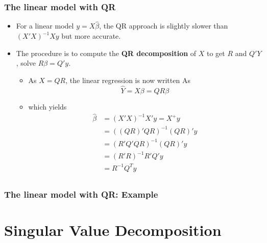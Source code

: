 \documentclass[10pt]{beamer}
\begin{document}
\begin{frame}
  \frametitle{The linear model with QR}

  \begin{itemize}
  \item For a linear model $y=X\hat\beta$, the QR approach is slightly
    slower than $(X'X)^{-1}Xy$ but more accurate.

  \item The procedure is to compute the \textbf{QR decomposition} of
    $X$ to get $R$ and $Q'Y$ , solve $R\beta = Q'y$.


    \begin{itemize}
    \item As $X=QR$, the linear regression is now written As
      \begin{equation*}
        \hat Y = X\beta = QR\beta
      \end{equation*}
    \item which yields
      \begin{align*}
        \hat \beta & = (X'X)^{-1}X'y= X^{+}y \\
        & = ((QR)'QR)^{-1}(QR)'y \\
        & = (R'Q'QR)^{-1}(QR)'y\\
        & = (R'R)^{-1}R'Q'y\\
        & = R^{-1}Q^Ty\\
      \end{align*}
    \end{itemize}

  \end{itemize}
\end{frame}


\begin{frame}
  \frametitle{The linear model with QR: Example}

\end{frame}

\section{Singular Value Decomposition}
\end{document}
